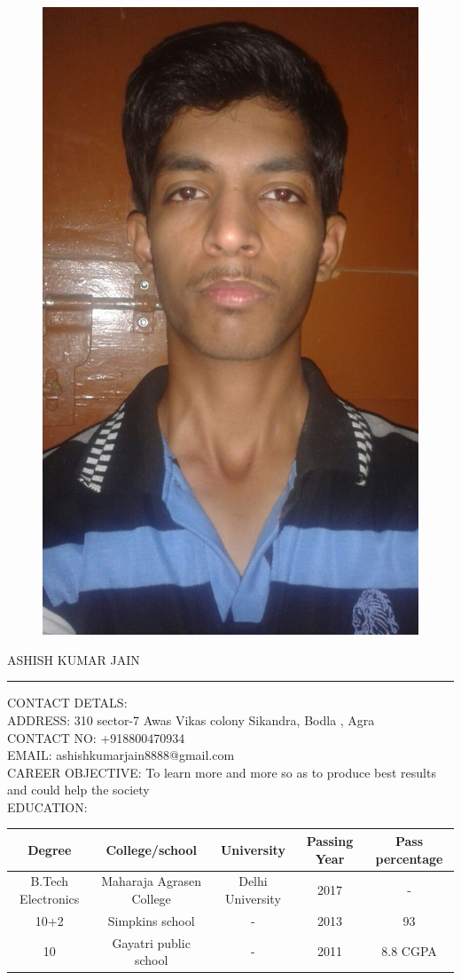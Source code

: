 \documentclass[11pt,a4paper]{article}
\begin{document}
\begin{figure}[t]
\includegraphics[width=0.2\linewidth]{pic}

\end{figure}

\textsf{\huge \bigskip ASHISH KUMAR JAIN}
\hrule
\large
\begin{flushleft}
	
	\textsf{CONTACT DETALS}:\\
	\textsf{ADDRESS:} 310 sector-7 Awas Vikas colony Sikandra, Bodla , Agra\\
	\textsf{CONTACT NO:} +918800470934\\
	\textsf{EMAIL:} ashishkumarjain8888@gmail.com\\ 
		\textsf{CAREER OBJECTIVE:}  To learn more and more so as to produce best results and could help the society\\
		\textsf{\bigskip  EDUCATION}:\\
		
		\begin{tabular}{|c|c|c|c|c|}
			\hline \textbf{ Degree}  &\textsf{College/school}  & \textsf{University} & \textsf{Passing Year} & \textsf{Pass percentage} \\ 
			\hline B.Tech Electronics & Maharaja Agrasen College  & Delhi University & 2017 & - \\ 
			\hline 
			10+2 & Simpkins school & - & 2013 & 93 \\
			
			\hline
			
			10 & Gayatri public school & - & 2011 & 8.8 CGPA \\
			
		\end{tabular} 
	
\end{flushleft}

 
\end{document}

